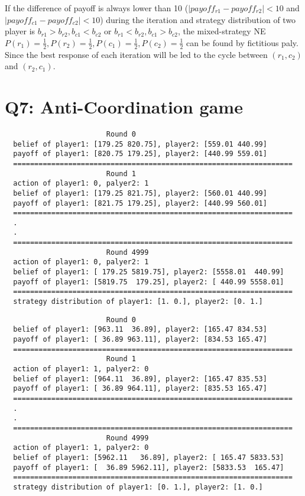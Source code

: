\documentclass[a4paper, oneside, final, 12pt]{scrartcl} %
\begin{document}
\begingroup
\raggedright
If the difference of payoff is always lower than 10 
($|payoff_{r1} - payoff_{r2}| < 10$ and $|payoff_{c1} - payoff_{c2}| < 10$) 
during the iteration and strategy distribution of two player is 
$b_{r1} > b_{r2}, b_{c1} < b_{c2}$  or  $b_{r1} < b_{r2}, b_{c1} > b_{c2}$, 
the mixed-strategy NE $P(r_1) = \frac{1}{2}, P(r_2) = \frac{1}{2}, 
P(c_1) = \frac{1}{2}, P(c_2) = \frac{1}{2}$ can be found by fictitious paly.
Since the best response of each iteration will be led to the cycle 
between $(r_1, c_2)$ and $(r_2, c_1)$.
\endgroup

\section{Q7: Anti-Coordination game}

\begin{lstlisting}
                        Round 0
  belief of player1: [179.25 820.75], player2: [559.01 440.99]
  payoff of player1: [820.75 179.25], player2: [440.99 559.01]
  ==================================================================
                        Round 1
  action of player1: 0, palyer2: 1
  belief of player1: [179.25 821.75], player2: [560.01 440.99]
  payoff of player1: [821.75 179.25], player2: [440.99 560.01]
  ==================================================================
  .
  .
  ==================================================================
                        Round 4999
  action of player1: 0, palyer2: 1
  belief of player1: [ 179.25 5819.75], player2: [5558.01  440.99]
  payoff of player1: [5819.75  179.25], player2: [ 440.99 5558.01]
  ==================================================================
  strategy distribution of player1: [1. 0.], player2: [0. 1.]
\end{lstlisting}

\newpage

\begin{lstlisting}
                        Round 0
  belief of player1: [963.11  36.89], player2: [165.47 834.53]
  payoff of player1: [ 36.89 963.11], player2: [834.53 165.47]
  ==================================================================
                        Round 1
  action of player1: 1, palyer2: 0
  belief of player1: [964.11  36.89], player2: [165.47 835.53]
  payoff of player1: [ 36.89 964.11], player2: [835.53 165.47]
  ==================================================================
  .
  .
  ==================================================================
                        Round 4999
  action of player1: 1, palyer2: 0
  belief of player1: [5962.11   36.89], player2: [ 165.47 5833.53]
  payoff of player1: [  36.89 5962.11], player2: [5833.53  165.47]
  ==================================================================
  strategy distribution of player1: [0. 1.], player2: [1. 0.]
\end{lstlisting}
\end{document}
